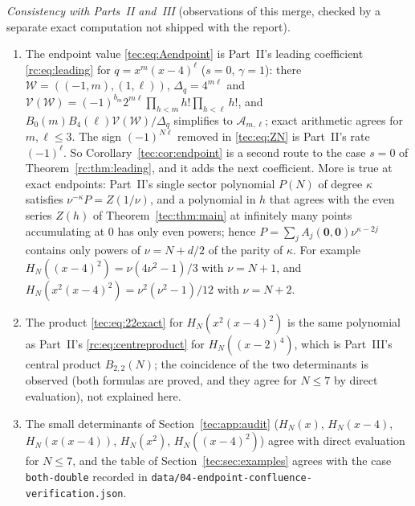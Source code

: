 \documentclass[11pt,a4paper]{article}
\numberwithin{equation}{section}
\theoremstyle{definition}
\theoremstyle{remark}
\newcommand{\V}{\mathcal V}
\begin{document}

\emph{Consistency with Parts~II and~III} (observations of this merge,
checked by a separate exact computation not shipped with the report).
\begin{enumerate}[leftmargin=*,itemsep=2pt]
\item The endpoint value \eqref{tec:eq:Aendpoint} is Part~II's leading
 coefficient \eqref{rc:eq:leading} for $q=x^m(x-4)^\ell$ ($s=0$,
 $\gamma=1$): there $\mathcal W=((-1,m),(1,\ell))$, $\Delta_q=4^{m\ell}$ and
 $\V(\mathcal W)=(-1)^{b_m}2^{m\ell}\prod_{h<m}h!\prod_{h<\ell}h!$, and
 $B_0(m)B_4(\ell)\V(\mathcal W)/\Delta_q$ simplifies to $\mathcal A_{m,\ell}$;
 exact arithmetic agrees for $m,\ell\le3$.  The sign $(-1)^{N\ell}$ removed
 in \eqref{tec:eq:ZN} is Part~II's rate $(-1)^\ell$.  So
 Corollary~\ref{tec:cor:endpoint} is a second route to the case $s=0$ of
 Theorem~\ref{rc:thm:leading}, and it adds the next coefficient.  More is
 true at exact endpoints: Part~II's single sector polynomial $P(N)$ of
 degree $\kappa$ satisfies $\nu^{-\kappa}P=Z(1/\nu)$, and a polynomial in
 $h$ that agrees with the even series $Z(h)$ of Theorem~\ref{tec:thm:main}
 at infinitely many points accumulating at $0$ has only even powers; hence
 $P=\sum_jA_j(\mathbf0,\mathbf0)\nu^{\kappa-2j}$ contains only powers of
 $\nu=N+d/2$ of the parity of $\kappa$.  For example
 $H_N((x-4)^2)=\nu(4\nu^2-1)/3$ with $\nu=N+1$, and
 $H_N(x^2(x-4)^2)=\nu^2(\nu^2-1)/12$ with $\nu=N+2$.
\item The product \eqref{tec:eq:22exact} for $H_N(x^2(x-4)^2)$ is the same
 polynomial as Part~II's \eqref{rc:eq:centreproduct} for $H_N((x-2)^4)$,
 which is Part~III's central product $B_{2,2}(N)$; the coincidence of the
 two determinants is observed (both formulas are proved, and they agree for
 $N\le7$ by direct evaluation), not explained here.
\item The small determinants of Section~\ref{tec:app:audit}
 ($H_N(x)$, $H_N(x-4)$, $H_N(x(x-4))$, $H_N(x^2)$, $H_N((x-4)^2)$) agree with
 direct evaluation for $N\le7$, and the table of
 Section~\ref{tec:sec:examples} agrees with the case \texttt{both-double}
 recorded in \nolinkurl{data/04-endpoint-confluence-verification.json}.
\end{enumerate}
\end{document}

